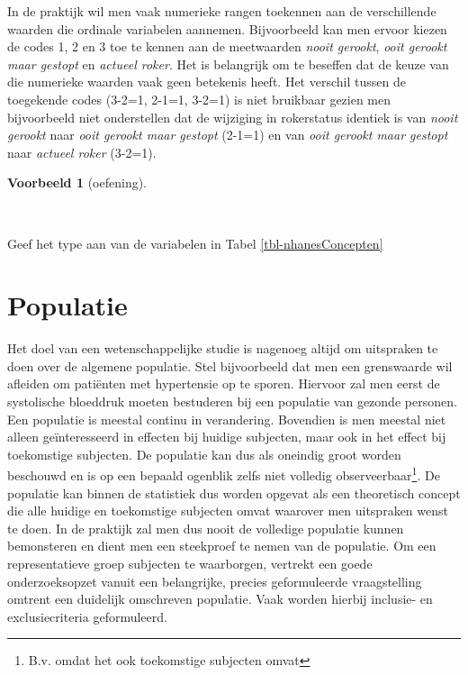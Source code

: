 \documentclass[
  dutch,
  letterpaper,
  12pt]{book}
\theoremstyle{definition}
\theoremstyle{definition}
\theoremstyle{definition}
\newtheorem{example}{Voorbeeld}[chapter]
\theoremstyle{remark}
\begin{document}
In de praktijk wil men vaak numerieke rangen toekennen aan de
verschillende waarden die ordinale variabelen aannemen. Bijvoorbeeld kan
men ervoor kiezen de codes 1, 2 en 3 toe te kennen aan de meetwaarden
\emph{nooit gerookt}, \emph{ooit gerookt maar gestopt} en \emph{actueel
roker}. Het is belangrijk om te beseffen dat de keuze van die numerieke
waarden vaak geen betekenis heeft. Het verschil tussen de toegekende
codes (3-2=1, 2-1=1, 3-2=1) is niet bruikbaar gezien men bijvoorbeeld
niet onderstellen dat de wijziging in rokerstatus identiek is van
\emph{nooit gerookt} naar \emph{ooit gerookt maar gestopt} (2-1=1) en
van \emph{ooit gerookt maar gestopt} naar \emph{actueel roker} (3-2=1).

\begin{example}[oefening]\protect\hypertarget{exm-oefening}{}\label{exm-oefening}

~

\end{example}

Geef het type aan van de variabelen in Tabel \ref{tbl-nhanesConcepten}

\section{Populatie}\label{sec-pop}

Het doel van een wetenschappelijke studie is nagenoeg altijd om
uitspraken te doen over de algemene populatie. Stel bijvoorbeeld dat men
een grenswaarde wil afleiden om patiënten met hypertensie op te sporen.
Hiervoor zal men eerst de systolische bloeddruk moeten bestuderen bij
een populatie van gezonde personen. Een populatie is meestal continu in
verandering. Bovendien is men meestal niet alleen geïnteresseerd in
effecten bij huidige subjecten, maar ook in het effect bij toekomstige
subjecten. De populatie kan dus als oneindig groot worden beschouwd en
is op een bepaald ogenblik zelfs niet volledig observeerbaar\footnote{B.v.
  omdat het ook toekomstige subjecten omvat}. De populatie kan binnen de
statistiek dus worden opgevat als een theoretisch concept die alle
huidige en toekomstige subjecten omvat waarover men uitspraken wenst te
doen. In de praktijk zal men dus nooit de volledige populatie kunnen
bemonsteren en dient men een steekproef te nemen van de populatie. Om
een representatieve groep subjecten te waarborgen, vertrekt een goede
onderzoeksopzet vanuit een belangrijke, precies geformuleerde
vraagstelling omtrent een duidelijk omschreven populatie. Vaak worden
hierbij inclusie- en exclusiecriteria geformuleerd.
\end{document}
